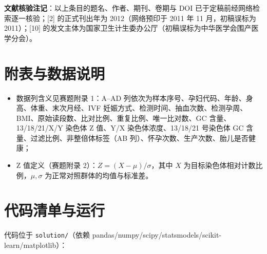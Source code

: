 \documentclass[11pt,a4paper]{ctexart}
\begin{document}
\noindent\textbf{文献核验注记}：以上条目的题名、作者、期刊、卷期与 DOI 已于定稿前经网络检索逐一核验；[2] 的正式刊出年为 2012（网络预印于 2011 年 11 月，初稿误标为 2011）；[10] 的发文主体为国家卫生计生委办公厅（初稿误标为中华医学会围产医学分会）。
\newpage
\appendix
\section{附表与数据说明}
\begin{itemize}
\item 数据列含义见赛题附录 1：A--AD 列依次为样本序号、孕妇代码、年龄、身高、体重、末次月经、IVF 妊娠方式、检测时间、抽血次数、检测孕周、BMI、原始读段数、比对比例、重复比例、唯一比对数、GC 含量、13/18/21/X/Y 染色体 Z 值、Y/X 染色体浓度、13/18/21 号染色体 GC 含量、过滤比例、非整倍体标签（AB 列）、怀孕次数、生产次数、胎儿是否健康；
\item Z 值定义（赛题附录 2）：$Z=(X-\mu)/\sigma$，其中 $X$ 为目标染色体相对计数比例，$\mu,\sigma$ 为正常对照群体的均值与标准差。
\end{itemize}

\section{代码清单与运行}
代码位于 {\tt solution/}（依赖 pandas/numpy/scipy/statsmodels/scikit-learn/matplotlib）：
\begin{table}[H]
\centering\small
\caption{代码文件与对应产出}
\end{table}
\end{document}
